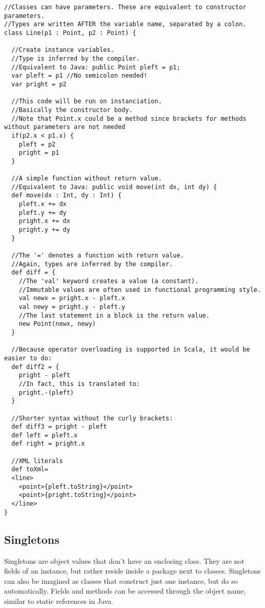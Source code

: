 \begin{lstlisting}[caption=Scala Syntax,label=lst:scala:syntax]
//Classes can have parameters. These are equivalent to constructor parameters.
//Types are written AFTER the variable name, separated by a colon.
class Line(p1 : Point, p2 : Point) {

  //Create instance variables.
  //Type is inferred by the compiler.
  //Equivalent to Java: public Point pleft = p1;
  var pleft = p1 //No semicolon needed!
  var pright = p2

  //This code will be run on instanciation.
  //Basically the constructor body.
  //Note that Point.x could be a method since brackets for methods without parameters are not needed
  if(p2.x < p1.x) {
    pleft = p2
    pright = p1
  }

  //A simple function without return value.
  //Equivalent to Java: public void move(int dx, int dy) {
  def move(dx : Int, dy : Int) {
    pleft.x += dx
    pleft.y += dy
    pright.x += dx
    pright.y += dy
  }

  //The '=' denotes a function with return value.
  //Again, types are inferred by the compiler.
  def diff = {
    //The 'val' keyword creates a value (a constant).
    //Immutable values are often used in functional programming style.
    val newx = pright.x - pleft.x
    val newy = pright.y - pleft.y
    //The last statement in a block is the return value.
    new Point(newx, newy)
  }

  //Because operator overloading is supported in Scala, it would be easier to do:
  def diff2 = {
    pright - pleft
    //In fact, this is translated to:
    pright.-(pleft)
  }

  //Shorter syntax without the curly brackets:
  def diff3 = pright - pleft
  def left = pleft.x
  def right = pright.x

  //XML literals
  def toXml=
  <line>
    <point>{pleft.toString}</point>
    <point>{pright.toString}</point>
  </line>
}
\end{lstlisting}


\subsection{Singletons}

Singletons are object values that don't have an enclosing class. They are not fields of an instance, but rather reside inside a package next to classes. Singletons can also be imagined as classes that construct just one instance, but do so automatically. Fields and methods can be accessed through the object name, similar to static references in Java.

